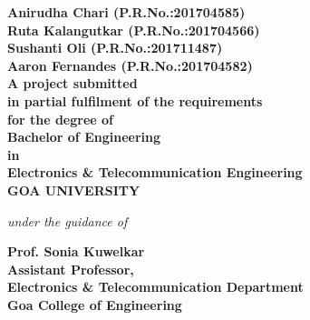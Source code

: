 \begin{center}
\vspace{0.4cm}
\bfseries{Anirudha Chari (P.R.No.:201704585)\\Ruta Kalangutkar (P.R.No.:201704566)\\Sushanti Oli (P.R.No.:201711487)\\Aaron Fernandes (P.R.No.:201704582)}\\
\vspace{0.4cm}
A project submitted\\in partial fulfilment of the requirements\\for the degree  of\\Bachelor of Engineering\\in\\Electronics \& Telecommunication Engineering\\GOA UNIVERSITY\\
\vspace{0.4cm}
\begin{small}
\emph{under the guidance of}\\
\end{small}
\vspace{0.5cm}
{\bfseries \large Prof. Sonia Kuwelkar}\\
{\bfseries \large Assistant Professor,\\Electronics \& Telecommunication Department\\Goa College of Engineering}\\
\vspace{1cm}
\end{center}
